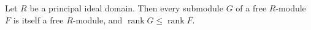 Let $R$ be a principal ideal domain. Then every submodule $G$ of a free $R$-module $F$ is itself a free $R$-module, and $\operatorname{rank} G \leq \operatorname{rank} F$.
